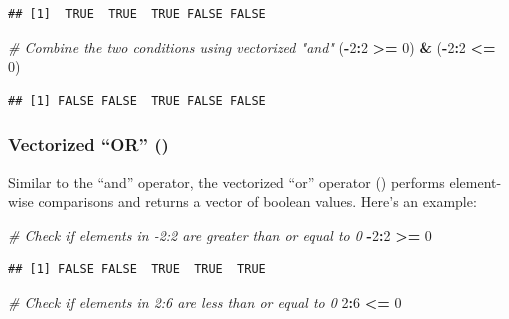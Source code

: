 \documentclass[
]{book}
\newenvironment{Shaded}{\begin{snugshade}}{\end{snugshade}}
\newcommand{\CommentTok}[1]{\textcolor[rgb]{0.56,0.35,0.01}{\textit{#1}}}
\newcommand{\DecValTok}[1]{\textcolor[rgb]{0.00,0.00,0.81}{#1}}
\newcommand{\NormalTok}[1]{#1}
\newcommand{\SpecialCharTok}[1]{\textcolor[rgb]{0.81,0.36,0.00}{\textbf{#1}}}
\begin{document}
\begin{verbatim}
## [1]  TRUE  TRUE  TRUE FALSE FALSE
\end{verbatim}

\begin{Shaded}
\begin{Highlighting}[]
\CommentTok{\# Combine the two conditions using vectorized "and"}
\NormalTok{(}\SpecialCharTok{{-}}\DecValTok{2}\SpecialCharTok{:}\DecValTok{2} \SpecialCharTok{\textgreater{}=} \DecValTok{0}\NormalTok{) }\SpecialCharTok{\&}\NormalTok{ (}\SpecialCharTok{{-}}\DecValTok{2}\SpecialCharTok{:}\DecValTok{2} \SpecialCharTok{\textless{}=} \DecValTok{0}\NormalTok{)}
\end{Highlighting}
\end{Shaded}

\begin{verbatim}
## [1] FALSE FALSE  TRUE FALSE FALSE
\end{verbatim}

\hypertarget{vectorized-or}{%
\subsubsection{\texorpdfstring{Vectorized ``OR'' (\texttt{\textbar{}})}{Vectorized ``OR'' (\textbar)}}\label{vectorized-or}}

Similar to the ``and'' operator, the vectorized ``or'' operator (\texttt{\textbar{}}) performs element-wise comparisons and returns a vector of boolean values. Here's an example:

\begin{Shaded}
\begin{Highlighting}[]
\CommentTok{\# Check if elements in {-}2:2 are greater than or equal to 0}
\SpecialCharTok{{-}}\DecValTok{2}\SpecialCharTok{:}\DecValTok{2} \SpecialCharTok{\textgreater{}=} \DecValTok{0}
\end{Highlighting}
\end{Shaded}

\begin{verbatim}
## [1] FALSE FALSE  TRUE  TRUE  TRUE
\end{verbatim}

\begin{Shaded}
\begin{Highlighting}[]
\CommentTok{\# Check if elements in 2:6 are less than or equal to 0}
\DecValTok{2}\SpecialCharTok{:}\DecValTok{6} \SpecialCharTok{\textless{}=} \DecValTok{0}
\end{Highlighting}
\end{Shaded}
\end{document}
